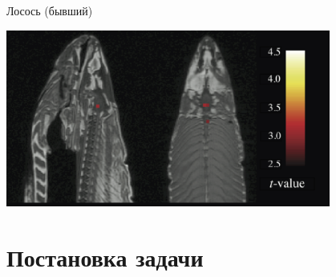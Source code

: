 \documentclass[9pt,pdf,utf8,hyperref={unicode},aspectratio=169]{beamer}
\begin{document}
\begin{frame}{Лосось (бывший)}
    \begin{center}
        \includegraphics[width=0.8\textwidth]{salmon.png}
    \end{center}
    
\end{frame}

\section{Постановка задачи}
\end{document}

